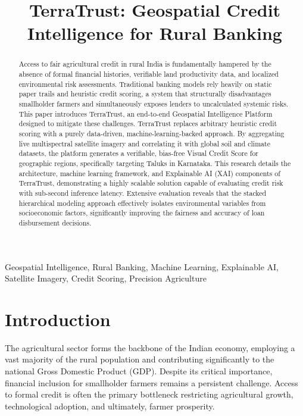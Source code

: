 \documentclass[conference]{IEEEtran}
\begin{document}
\title{TerraTrust: Geospatial Credit Intelligence for Rural Banking}

\author{
}

\maketitle

\begin{abstract}
Access to fair agricultural credit in rural India is fundamentally hampered by the absence of formal financial histories, verifiable land productivity data, and localized environmental risk assessments. Traditional banking models rely heavily on static paper trails and heuristic credit scoring, a system that structurally disadvantages smallholder farmers and simultaneously exposes lenders to uncalculated systemic risks. This paper introduces TerraTrust, an end-to-end Geospatial Intelligence Platform designed to mitigate these challenges. TerraTrust replaces arbitrary heuristic credit scoring with a purely data-driven, machine-learning-backed approach. By aggregating live multispectral satellite imagery and correlating it with global soil and climate datasets, the platform generates a verifiable, bias-free Visual Credit Score for geographic regions, specifically targeting Taluks in Karnataka. This research details the architecture, machine learning framework, and Explainable AI (XAI) components of TerraTrust, demonstrating a highly scalable solution capable of evaluating credit risk with sub-second inference latency. Extensive evaluation reveals that the stacked hierarchical modeling approach effectively isolates environmental variables from socioeconomic factors, significantly improving the fairness and accuracy of loan disbursement decisions.
\end{abstract}

\begin{IEEEkeywords}
Geospatial Intelligence, Rural Banking, Machine Learning, Explainable AI, Satellite Imagery, Credit Scoring, Precision Agriculture
\end{IEEEkeywords}

\section{\textbf{Introduction}}
The agricultural sector forms the backbone of the Indian economy, employing a vast majority of the rural population and contributing significantly to the national Gross Domestic Product (GDP). Despite its critical importance, financial inclusion for smallholder farmers remains a persistent challenge. Access to formal credit is often the primary bottleneck restricting agricultural growth, technological adoption, and ultimately, farmer prosperity. 
\end{document}
